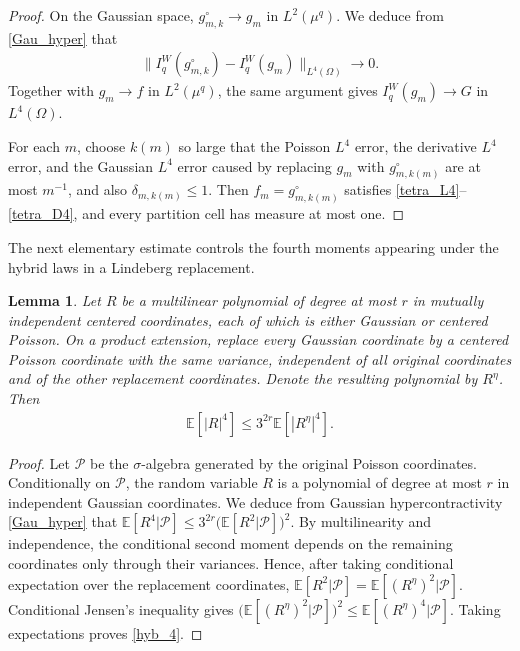 \documentclass[letterpaper,11pt,reqno]{amsart}
\numberwithin{equation}{section}
\theoremstyle{plain}
\newtheorem{lemma}[theorem]{Lemma}
\theoremstyle{definition}
\theoremstyle{remark}
\newcommand{\E}{\mathbb{E}}
\newcommand{\noi}{\noindent}
\newcommand{\s}{\sigma}
\begin{document}
\begin{proof}
On the Gaussian space,
$g_{m,k}^{\circ}\to g_m$ in $L^2(\mu^q)$.  We deduce from
\eqref{Gau_hyper} that
\noi
\begin{align*}
 \big\|I_q^W(g_{m,k}^{\circ})-I_q^W(g_m)\big\|_{L^4(\Omega)}\longrightarrow0.
\end{align*}
Together with $g_m\to f$ in $L^2(\mu^q)$, the same argument gives
$I_q^W(g_m)\to G$ in $L^4(\Omega)$.

For each $m$, choose $k(m)$ so large that the Poisson $L^4$
error, the derivative $L^4$ error, and the Gaussian $L^4$ error caused
by replacing $g_m$ with $g_{m,k(m)}^{\circ}$ are at most $m^{-1}$,
and also $\delta_{m,k(m)}\leq1$.  Then
$f_m=g_{m,k(m)}^{\circ}$ satisfies
\eqref{tetra_L4}--\eqref{tetra_D4}, and every partition cell has
measure at most one.
\qedhere

\end{proof}

The next elementary estimate controls the fourth moments appearing
under the hybrid laws in a Lindeberg replacement.

\begin{lemma}
\label{lem_hyb_4}
Let $R$ be a multilinear polynomial of degree at most $r$ in mutually
independent centered coordinates, each of which is either Gaussian or
centered Poisson.  On a product extension, replace every Gaussian
coordinate by a centered Poisson coordinate with the same variance,
independent of all original coordinates and of the other replacement
coordinates.  Denote the resulting polynomial by $R^\eta$.  Then
\noi
\begin{align}
 \E[|R|^4]\leq3^{2r}\E[|R^{\eta}|^4].
 \label{hyb_4}
\end{align}
\end{lemma}

\begin{proof}
Let $\mathcal P$ be the $\s$-algebra generated by the original
Poisson coordinates.  Conditionally on $\mathcal P$, the random
variable $R$ is a polynomial of degree at most $r$ in independent
Gaussian coordinates.  We deduce from Gaussian hypercontractivity
\eqref{Gau_hyper} that
$\E[R^4 | \mathcal P]\leq3^{2r}
\bigl(\E[R^2 | \mathcal P]\bigr)^2$.
By multilinearity and independence, the conditional second moment
depends on the remaining coordinates only through their variances.
Hence, after taking conditional expectation over the replacement
coordinates,
$\E[R^2 | \mathcal P]=\E[(R^\eta)^2 | \mathcal P]$.
Conditional Jensen's inequality gives
$\bigl(\E[(R^\eta)^2 | \mathcal P]\bigr)^2\leq
\E[(R^\eta)^4 | \mathcal P]$.  Taking expectations proves
\eqref{hyb_4}.
\end{proof}
\end{document}
